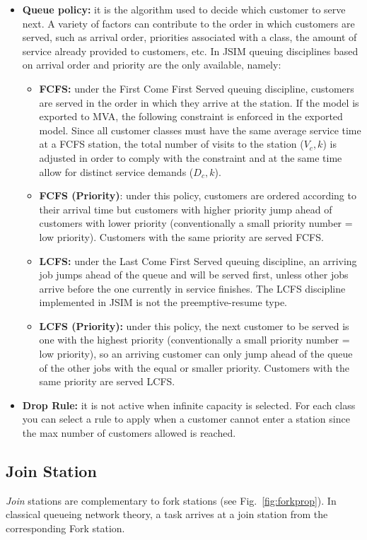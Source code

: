 \begin{itemize}
\item \textbf{Queue policy:} it is the algorithm used to decide
which customer to serve next. A variety of factors can contribute
to the order in which customers are served, such as arrival order,
priorities associated with a class, the amount of service already
provided to customers, etc. In JSIM queuing disciplines based on
arrival order and priority are the only available, namely:
\begin{itemize}
\item \textbf{FCFS:} under the First Come First Served queuing
discipline, customers are served in the order in which they arrive
at the station. If the model is exported to MVA, the following
constraint is enforced in the exported model. Since all customer
classes must have the same average service time at a FCFS station,
the total number of visits to the station ($V_c,k$) is adjusted in
order to comply with the constraint and at the same time allow for
distinct service demands ($D_c,k$). \item \textbf{FCFS
(Priority)}: under this policy, customers are ordered according to
their arrival time but customers with higher priority jump ahead
of customers with lower priority (conventionally a small priority
number = low priority). Customers with the same priority are
served FCFS. \item \textbf{LCFS:} under the Last Come First Served
queuing discipline, an arriving job jumps ahead of the queue and
will be served first, unless other jobs arrive before the one
currently in service finishes. The LCFS discipline implemented in
JSIM is not the preemptive-resume type. \item \textbf{LCFS
(Priority):} under this policy, the next customer to be served is
one with the highest priority (conventionally a small priority
number = low priority), so an arriving customer can only jump
ahead of the queue of the other jobs with the equal or smaller
priority. Customers with the same priority are served LCFS.
\end{itemize}
\item \textbf{Drop Rule:} it is not active when infinite capacity
is selected. For each class you can select a rule to apply when a
customer cannot enter a station since the max number of customers
allowed is reached.
\end{itemize}

\subsection{Join Station}
 \emph{Join} stations are complementary to fork
stations (see Fig.~\ref{fig:forkprop}). In classical queueing
network theory, a task arrives at a join station from the
corresponding Fork station.\\

